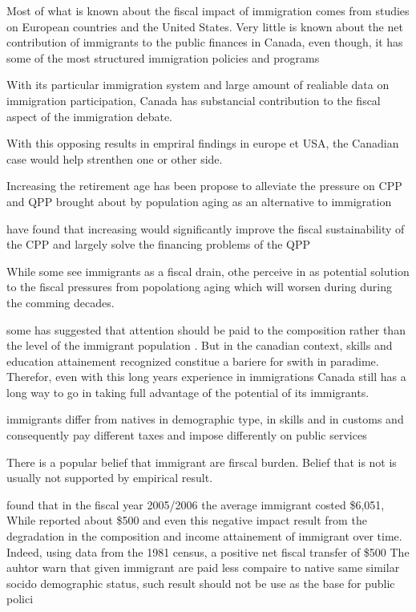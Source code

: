  Most of what is known about the fiscal impact of immigration comes from studies on European countries and the United States. Very little is known about the net contribution of immigrants to the public finances in Canada, even though, it has some of the most structured immigration policies and programs

  With its particular immigration system and large amount of realiable data on immigration participation, Canada has substancial contribution to the fiscal aspect of the immigration debate.

  With this opposing results in empriral findings in europe et USA, the Canadian case would help strenthen one or other side.

  Increasing the retirement age has been propose  to alleviate the pressure on CPP and QPP brought about by population aging as an alternative to immigration \citep{Hering.Klassen.2010}

  \citep{Hering.Klassen.2010} have found that increasing would significantly improve the fiscal sustainability of the CPP and largely solve the financing problems of the QPP

  While some see immigrants as a fiscal drain, othe perceive in as potential solution to the fiscal pressures from popolationg aging \citep{RePEc:nbr:nberch:10849} which will worsen during during the comming decades.

  some has suggested that attention should be paid to the composition rather than the level of the immigrant population \citep{RePEc:nbr:nberch:10849}. But in the canadian context, skills and education attainement recognized constitue a bariere for swith in paradime. Therefor, even with this long years experience in immigrations Canada still has a long way to go in taking full advantage of the potential of its immigrants.








  immigrants differ from natives in demographic type, in skills and in customs and consequently pay different taxes and impose differently on public services \citep{Preston:2014uw}

  There is a popular belief that immigrant are firscal burden. Belief that is not is usually not supported by empirical result.

  \citep{grubelFiscalTransfersImmigrants2012} found that in the fiscal year 2005/2006 the average immigrant costed \$6,051,  While \citep{Javdani:2013gu} reported about \$500 and even this negative impact result from the degradation in the composition and income attainement of immigrant over time. Indeed, using data from the 1981 census, \citep{Akbari:1989fh} a positive net fiscal transfer of \$500
  The auhtor warn that given immigrant are paid less compaire to native same similar socido demographic status, such result should not be use as the base for public polici

